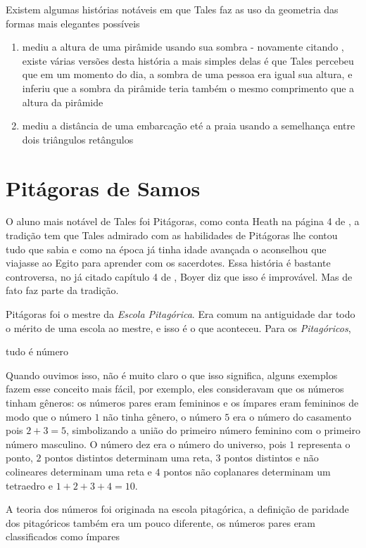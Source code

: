 \documentclass{article}
\begin{document}
Existem algumas histórias notáveis em que Tales faz as uso da geometria
das formas mais elegantes possíveis 
\begin{enumerate}
	\item mediu a altura de uma pirâmide usando sua sombra - novamente 
		citando \cite{Heath}, existe várias versões desta história
		a mais simples delas é que Tales percebeu que em um momento
		do dia, a sombra de uma pessoa era igual sua altura, e inferiu
		que a sombra da pirâmide teria também o mesmo comprimento que
		a altura da pirâmide
	\item mediu a distância de uma embarcação eté a praia usando a semelhança
		entre dois triângulos retângulos
\end{enumerate}


\section{Pitágoras de Samos}

O aluno mais notável de Tales foi Pitágoras, como conta Heath na página 4 de \cite{Heath}, a tradição tem que Tales admirado com as habilidades de Pitágoras lhe contou tudo
que sabia e como na época já tinha idade avançada o aconselhou que viajasse ao
Egito para aprender com os sacerdotes. Essa história é bastante controversa,
no já citado capítulo 4 de \cite{Boyer}, Boyer diz que isso é improvável. Mas 
de fato faz parte da tradição.

Pitágoras foi o mestre da \emph{Escola Pitagórica}. Era comum na antiguidade
dar todo o mérito de uma escola ao mestre, e isso é o que aconteceu. Para os
\emph{Pitagóricos},

\begin{center}
\begin{framed}
	tudo é número
\end{framed}
\end{center}

Quando ouvimos isso, não é muito claro o que isso significa, alguns exemplos
fazem esse conceito mais fácil, por exemplo, eles consideravam que os números 
tinham gêneros: os números pares eram femininos e os ímpares eram femininos
de modo que o número $1$ não tinha gênero, o número $5$ era o número do casamento
pois $2 + 3 = 5$, simbolizando a união do primeiro número feminino com o 
primeiro número masculino. O número dez era o número do universo, pois 
$1$ representa o ponto, $2$ pontos distintos determinam uma reta, $3$ pontos 
distintos e não colineares determinam uma reta e $4$ pontos não coplanares 
determinam um tetraedro e $1 + 2 + 3 + 4 = 10$.

A teoria dos números foi originada na escola pitagórica, a definição de paridade
dos pitagóricos também era um pouco diferente, os números pares eram classificados
como ímpares 



\end{document}
